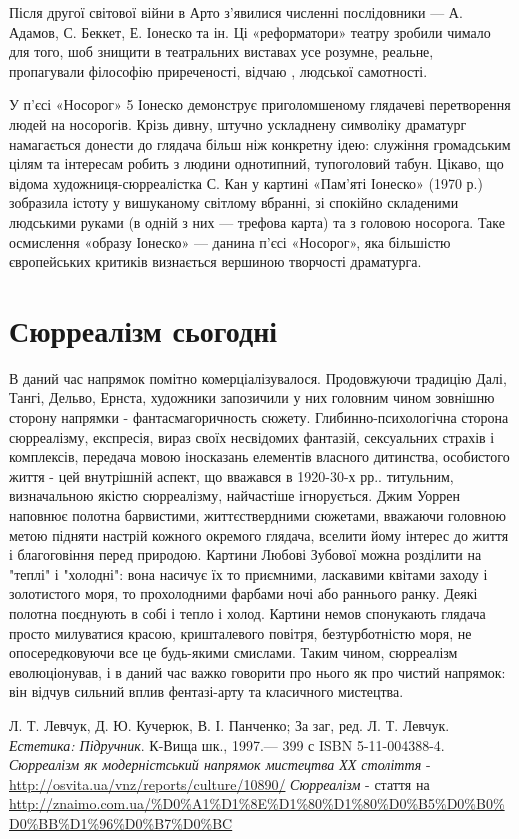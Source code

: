 \documentclass[14pt]{extarticle} %
\begin{document}
Після другої світової війни в Арто з'явилися численні послідовники — А. Адамов, С. Беккет, Е. Іонеско та ін.
Ці «реформатори» театру зробили чимало для того, шоб знищити в театральних виставах усе розумне, реальне, пропагували філософію приреченості, відчаю
, людської самотності.

У п'єсі «Носорог» 5 Іонеско демонструє приголомшеному глядачеві перетворення людей на носорогів. Крізь дивну, штучно ускладнену символіку
драматург намагається донести до глядача більш ніж конкретну ідею: служіння громадським цілям та інтересам робить з людини однотипний,
тупоголовий табун. Цікаво, що відома художниця-сюрреалістка С. Кан у картині «Пам'яті Іонеско» (1970 р.) зобразила істоту у вишуканому світлому
вбранні, зі спокійно складеними людськими руками (в одній з них — трефова карта) та з головою носорога. 
Таке осмислення «образу Іонеско» — данина п'єсі «Носорог», яка більшістю європейських критиків визнається вершиною творчості драматурга.
\section{Сюрреалізм сьогодні}
В даний час напрямок помітно комерціалізувалося. Продовжуючи традицію Далі, Тангі, Дельво, Ернста, художники запозичили у них головним чином 
зовнішню сторону напрямки - фантасмагоричность сюжету. Глибинно-психологічна сторона сюрреалізму, експресія, вираз своїх несвідомих фантазій,
сексуальних страхів і комплексів, передача мовою іносказань елементів власного дитинства, особистого життя - цей внутрішній аспект,
що вважався в 1920-30-х рр.. титульним, визначальною якістю сюрреалізму, найчастіше ігнорується. Джим Уоррен наповнює полотна барвистими,
життєствердними сюжетами, вважаючи головною метою підняти настрій кожного окремого глядача, вселити йому інтерес до життя і благоговіння
перед природою. Картини Любові Зубової можна розділити на "теплі" і "холодні": вона насичує їх то приємними, ласкавими квітами заходу і золотистого
моря, то прохолодними фарбами ночі або раннього ранку. Деякі полотна поєднують в собі і тепло і холод. Картини немов спонукають глядача
просто милуватися красою, кришталевого повітря, безтурботністю моря, не опосередковуючи все це будь-якими смислами. Таким чином, сюрреалізм
еволюціонував, і в даний час важко говорити про нього як про чистий напрямок: він відчув сильний вплив фентазі-арту та класичного мистецтва. 
\begin{thebibliography}{9}
Л. Т. Левчук, Д. Ю. Кучерюк, В. І. Панченко; За заг, ред. Л. Т. Левчук.
{\em Естетика: Підручник}.
К-Вища шк., 1997.— 399 с ISBN 5-11-004388-4.
{\em Сюрреалізм як модерністський напрямок мистецтва ХХ століття} - \url{http://osvita.ua/vnz/reports/culture/10890/}
{\em Сюрреалізм} - стаття на \url{http://znaimo.com.ua/%D0%A1%D1%8E%D1%80%D1%80%D0%B5%D0%B0%D0%BB%D1%96%D0%B7%D0%BC}
\end{thebibliography}
\end{document}
